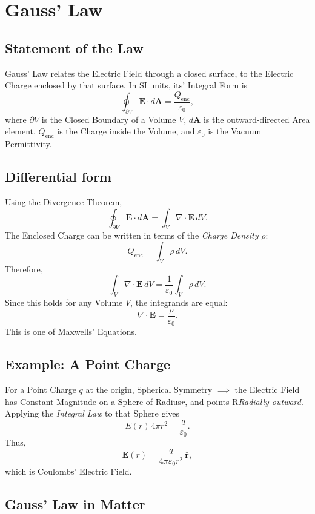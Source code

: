 \documentclass[a4paper, 10pt, onepage]{elegantbook}
\begin{document}
\section{Gauss' Law}

\subsection{Statement of the Law}

Gauss' Law relates the Electric Field through a closed surface, to the Electric Charge enclosed by that surface. In SI units, its' Integral Form is
\[
\boxed{
\oint_{\partial V}\mathbf{E}\cdot d\mathbf{A}
=\frac{Q_{\mathrm{enc}}}{\varepsilon_0}
},
\]
where \(\partial V\) is the Closed Boundary of a Volume \(V\),
\(d\mathbf{A}\) is the outward-directed Area element,
\(Q_{\mathrm{enc}}\) is the Charge inside the Volume, and
\(\varepsilon_0\) is the Vacuum Permittivity.

\subsection{Differential form}

Using the Divergence Theorem,
\[
\oint_{\partial V}\mathbf{E}\cdot d\mathbf{A}
=\int_V \nabla\cdot\mathbf{E}\,dV.
\]
The Enclosed Charge can be written in terms of the \emph{Charge Density}
\(\rho\):
\[
Q_{\mathrm{enc}}=\int_V\rho\,dV.
\]
Therefore,
\[
\int_V \nabla\cdot\mathbf{E}\,dV
=\frac{1}{\varepsilon_0}\int_V\rho\,dV.
\]
Since this holds for any Volume \(V\), the integrands are equal:
\[
\boxed{
\nabla\cdot\mathbf{E}=\frac{\rho}{\varepsilon_0}
}.
\]
This is one of Maxwells' Equations.

\subsection{Example: A Point Charge}

For a Point Charge \(q\) at the origin, Spherical Symmetry $\implies$ the Electric Field has Constant Magnitude on a Sphere of Radius\(r\), and points R\emph{Radially outward}. Applying the \emph{Integral Law} to that Sphere gives
\[
E(r)\,4\pi r^2=\frac{q}{\varepsilon_0}.
\]
Thus,
\[
\mathbf{E}(r)
=\frac{q}{4\pi\varepsilon_0 r^2}\,\hat{\mathbf{r}},
\]
which is Coulombs' Electric Field.

\subsection{Gauss' Law in Matter}
\end{document}
